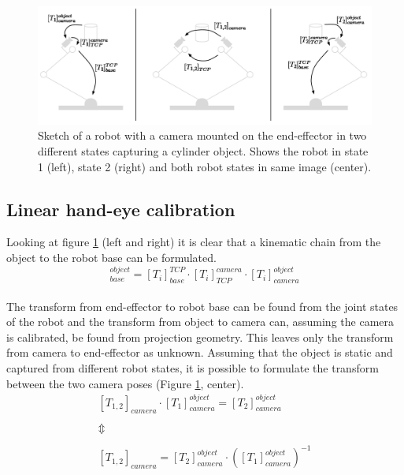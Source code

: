 \begin{figure}[htb]
	\begin{center}
		\includegraphics[width=\textwidth,trim=0 0 0 0]{graphics/03_calibration/hand_eye_transforms.pdf}%
		\caption{Sketch of a robot with a camera mounted on the end-effector in two different states capturing a cylinder object. Shows the robot in state 1 (left), state 2 (right) and both robot states in same image (center).}\label{fig:hand_eye_transforms}
		
	\end{center}
\end{figure}

\subsection{Linear hand-eye calibration}
\noindent Looking at figure \ref{fig:hand_eye_transforms} (left and right) it is clear that a kinematic chain from the object to the robot base can be formulated.\\

\begin{equation}
	[T_{i}]_{base}^{object} = [T_{i}]_{base}^{TCP} \cdot [T_{i}]_{TCP}^{camera} \cdot [T_{i}]_{camera}^{object}
\end{equation} \\

\noindent The transform from end-effector to robot base can be found from the joint states of the robot and the transform from object to camera can, assuming the camera is calibrated, be found from projection geometry. This leaves only the transform from camera to end-effector as unknown. Assuming that the object is static and captured from different robot states, it is possible to formulate the transform between the two camera poses (Figure \ref{fig:hand_eye_transforms}, center).\\

\begin{equation}\label{eq:object_camera}
\begin{matrix}
[T_{1,2}]_{camera} \cdot [T_{1}]_{camera}^{object} = [T_{2}]_{camera}^{object} \\
\\  
\Updownarrow \\ 
\\ 
[T_{1,2}]_{camera} = [T_{2}]_{camera}^{object} \cdot ([T_{1}]_{camera}^{object})^{-1}
\end{matrix}
\end{equation}\\ 

